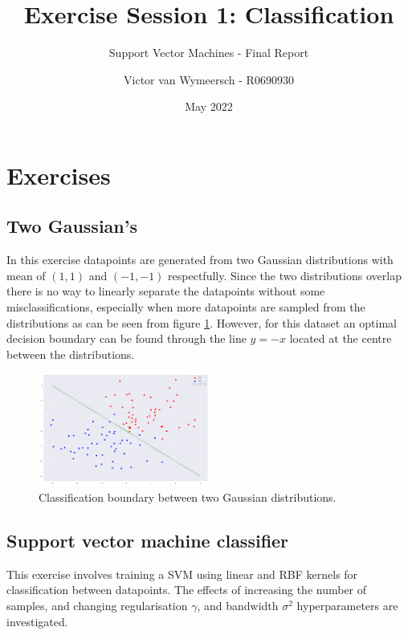 \documentclass{article}
\title{Exercise Session 1: Classification}
\subtitle{Support Vector Machines - Final Report}
\author{Victor van Wymeersch - R0690930}
\date{May 2022}
\begin{document}
\maketitle

\section{Exercises}
    \subsection{Two Gaussian's}
        In this exercise datapoints are generated from two Gaussian distributions with mean of $(1,1)$ and $(-1,-1)$ respectfully. Since the two distributions overlap there is no way to linearly separate the datapoints without some misclassifications, especially when more datapoints are sampled from the distributions as can be seen from figure \ref{fig:two_gaussians}. However, for this dataset an optimal decision boundary can be found through the line $y=-x$ located at the centre between the distributions. 
        \begin{figure}[h]
            \centering
            \includegraphics[width=0.5\textwidth]{Assignment 1/figures/two_gaussians.png}
            \caption{Classification boundary between two Gaussian distributions. }
            \label{fig:two_gaussians}
        \end{figure}
    
    \subsection{Support vector machine classifier}
        This exercise involves training a SVM using linear and RBF kernels for classification between datapoints. The effects of increasing the number of samples, and changing regularisation $\gamma$, and bandwidth $\sigma^2$ hyperparameters are investigated. 
        
\end{document}
